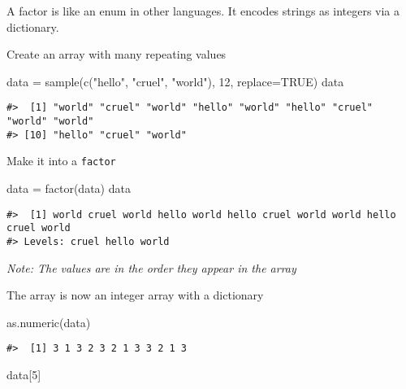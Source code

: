\documentclass[
]{book}
\newenvironment{Shaded}{\begin{snugshade}}{\end{snugshade}}
\newcommand{\AttributeTok}[1]{\textcolor[rgb]{0.77,0.63,0.00}{#1}}
\newcommand{\ConstantTok}[1]{\textcolor[rgb]{0.00,0.00,0.00}{#1}}
\newcommand{\DecValTok}[1]{\textcolor[rgb]{0.00,0.00,0.81}{#1}}
\newcommand{\FunctionTok}[1]{\textcolor[rgb]{0.00,0.00,0.00}{#1}}
\newcommand{\NormalTok}[1]{#1}
\newcommand{\OtherTok}[1]{\textcolor[rgb]{0.56,0.35,0.01}{#1}}
\newcommand{\StringTok}[1]{\textcolor[rgb]{0.31,0.60,0.02}{#1}}
\begin{document}
A factor is like an enum in other languages. It encodes strings as integers via a dictionary.

Create an array with many repeating values

\begin{Shaded}
\begin{Highlighting}[]
\NormalTok{data }\OtherTok{=} \FunctionTok{sample}\NormalTok{(}\FunctionTok{c}\NormalTok{(}\StringTok{"hello"}\NormalTok{, }\StringTok{"cruel"}\NormalTok{, }\StringTok{"world"}\NormalTok{), }\DecValTok{12}\NormalTok{, }\AttributeTok{replace=}\ConstantTok{TRUE}\NormalTok{)}
\NormalTok{data}
\end{Highlighting}
\end{Shaded}

\begin{verbatim}
#>  [1] "world" "cruel" "world" "hello" "world" "hello" "cruel" "world" "world"
#> [10] "hello" "cruel" "world"
\end{verbatim}

Make it into a \texttt{factor}

\begin{Shaded}
\begin{Highlighting}[]
\NormalTok{data }\OtherTok{=} \FunctionTok{factor}\NormalTok{(data)}
\NormalTok{data}
\end{Highlighting}
\end{Shaded}

\begin{verbatim}
#>  [1] world cruel world hello world hello cruel world world hello cruel world
#> Levels: cruel hello world
\end{verbatim}

\emph{Note: The values are in the order they appear in the array}

The array is now an integer array with a dictionary

\begin{Shaded}
\begin{Highlighting}[]
\FunctionTok{as.numeric}\NormalTok{(data)}
\end{Highlighting}
\end{Shaded}

\begin{verbatim}
#>  [1] 3 1 3 2 3 2 1 3 3 2 1 3
\end{verbatim}

\begin{Shaded}
\begin{Highlighting}[]
\NormalTok{data[}\DecValTok{5}\NormalTok{]}
\end{Highlighting}
\end{Shaded}
\end{document}
